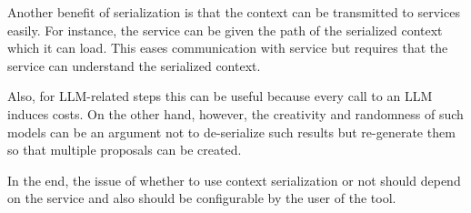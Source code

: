 Another benefit of serialization is that the context can be transmitted to services easily. For instance, the service can be given the path of the serialized context which it can load. This eases communication with service  but requires that the service can understand the serialized context. 

Also, for \ac{LLM}-related steps this can be useful because every call to an \ac{LLM} induces costs. On the other hand, however, the creativity and randomness of such models can be an argument not to de-serialize such results but re-generate them so that multiple proposals can be created.



In the end, the issue of whether to use context serialization or not should depend on the service and also should be configurable by the user of the tool. 

